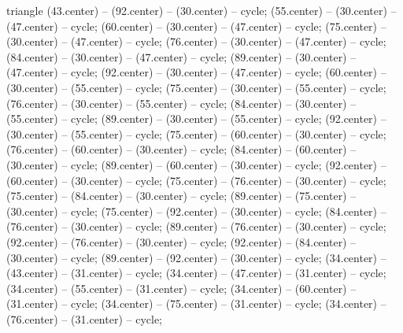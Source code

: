 \begin{pgfonlayer}{triangle}
 (43.center) -- (92.center) -- (30.center) -- cycle; 
 (55.center) -- (30.center) -- (47.center) -- cycle; 
 (60.center) -- (30.center) -- (47.center) -- cycle; 
 (75.center) -- (30.center) -- (47.center) -- cycle; 
 (76.center) -- (30.center) -- (47.center) -- cycle; 
 (84.center) -- (30.center) -- (47.center) -- cycle; 
 (89.center) -- (30.center) -- (47.center) -- cycle; 
 (92.center) -- (30.center) -- (47.center) -- cycle; 
 (60.center) -- (30.center) -- (55.center) -- cycle; 
 (75.center) -- (30.center) -- (55.center) -- cycle; 
 (76.center) -- (30.center) -- (55.center) -- cycle; 
 (84.center) -- (30.center) -- (55.center) -- cycle; 
 (89.center) -- (30.center) -- (55.center) -- cycle; 
 (92.center) -- (30.center) -- (55.center) -- cycle; 
 (75.center) -- (60.center) -- (30.center) -- cycle; 
 (76.center) -- (60.center) -- (30.center) -- cycle; 
 (84.center) -- (60.center) -- (30.center) -- cycle; 
 (89.center) -- (60.center) -- (30.center) -- cycle; 
 (92.center) -- (60.center) -- (30.center) -- cycle; 
 (75.center) -- (76.center) -- (30.center) -- cycle; 
 (75.center) -- (84.center) -- (30.center) -- cycle; 
 (89.center) -- (75.center) -- (30.center) -- cycle; 
 (75.center) -- (92.center) -- (30.center) -- cycle; 
 (84.center) -- (76.center) -- (30.center) -- cycle; 
 (89.center) -- (76.center) -- (30.center) -- cycle; 
 (92.center) -- (76.center) -- (30.center) -- cycle; 
 (92.center) -- (84.center) -- (30.center) -- cycle; 
 (89.center) -- (92.center) -- (30.center) -- cycle; 
 (34.center) -- (43.center) -- (31.center) -- cycle; 
 (34.center) -- (47.center) -- (31.center) -- cycle; 
 (34.center) -- (55.center) -- (31.center) -- cycle; 
 (34.center) -- (60.center) -- (31.center) -- cycle; 
 (34.center) -- (75.center) -- (31.center) -- cycle; 
 (34.center) -- (76.center) -- (31.center) -- cycle; 

\end{pgfonlayer}

